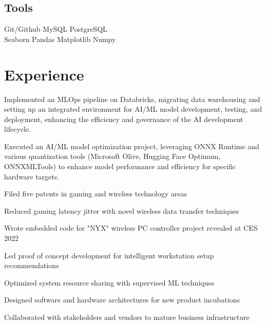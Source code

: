 \documentclass[]{resume-openfont}
\begin{document}
\begin{minipage}[t]{1\textwidth}
\begin{multicols}{3}
    \subsection{Tools}
    Git/Github \textbullet{} MySQL \textbullet{} PostgreSQL \\
    Seaborn \textbullet{} Pandas \textbullet{} Matplotlib \textbullet{} Numpy
    \sectionsep

    \vfill\null
\end{multicols}
\end{minipage} 

\vspace{-5 mm}

\begin{minipage}[t]{1\textwidth}
\section{Experience}
\titlerule
\vspace{2.5 mm}

\vspace{\topsep}
\begin{tightemize}
\item Implemented an MLOps pipeline on Databricks, migrating data warehousing and setting up an integrated environment for AI/ML model development, testing, and deployment, enhancing the efficiency and governance of the AI development lifecycle.
\item Executed an AI/ML model optimization project, leveraging ONNX Runtime and various quantization tools (Microsoft Olive, Hugging Face Optimum, ONNXMLTools) to enhance model performance and efficiency for specific hardware targets.
\item Filed five patents in gaming and wireless technology areas
\item Reduced gaming latency jitter with novel wireless data transfer techniques
\item Wrote embedded code for "NYX" wireless PC controller project revealed at CES 2022
\item Led proof of concept development for intelligent workstation setup recommendations
\end{tightemize}
\sectionsep

\begin{tightemize}
\item Optimized system resource sharing with supervised ML techniques
\item Designed software and hardware architectures for new product incubations
\item Collaborated with stakeholders and vendors to mature business infrastructure
\end{tightemize}
\sectionsep


\end{minipage}
\end{document}
